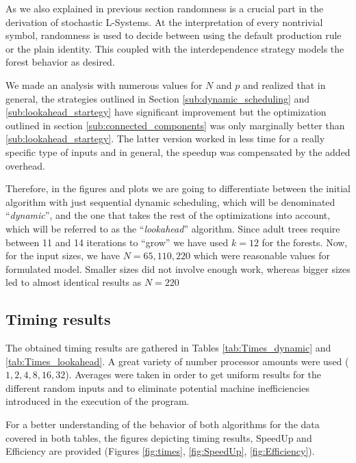 \documentclass[letterpaper,twoside,11pt]{article}
\begin{document}
\begin{multicols}{2}
As we also explained in previous section randomness is a crucial part in the derivation of stochastic L-Systems. At the interpretation of every nontrivial symbol, randomness is used to decide between using the default production rule or the plain identity. This coupled with the interdependence strategy models the forest behavior as desired.

We made an analysis with numerous values for $N$ and $p$ and realized that in general, the strategies outlined in Section \ref{sub:dynamic_scheduling} and \ref{sub:lookahead_startegy} have significant improvement but the optimization outlined in section \ref{sub:connected_components} was only marginally better than \ref{sub:lookahead_startegy}. The latter version worked in less time for a really specific type of inputs and in general, the speedup was compensated by the added overhead.

Therefore, in the figures and plots we are going to differentiate between the initial algorithm with just sequential dynamic scheduling, which will be denominated ``\emph{dynamic}'', and the one that takes the rest of the optimizations into account, which will be referred to as the ``\emph{lookahead}'' algorithm. Since adult trees require between 11 and 14 iterations to ``grow'' we have used $k = 12$ for the forests. Now, for the input sizes, we have $N = 65, 110, 220$ which were reasonable values for formulated model. Smaller sizes did not involve enough work, whereas bigger sizes led to almost identical results as $N = 220 $

\subsection{Timing results} %
\label{sub:timing_results}
The obtained timing results are gathered in Tables \ref{tab:Times_dynamic} and \ref{tab:Times_lookahead}. A great variety of number processor amounts were used ($1, 2, 4, 8, 16, 32$). Averages were taken in order to get uniform results for the different random inputs and to eliminate potential machine inefficiencies introduced in the execution of the program.

For a better understanding of the behavior of both algorithms for the data covered in both tables, the figures depicting timing results, SpeedUp and Efficiency are provided (Figures \ref{fig:times}, \ref{fig:SpeedUp}, \ref{fig:Efficiency}).


\end{multicols}
\end{document}
